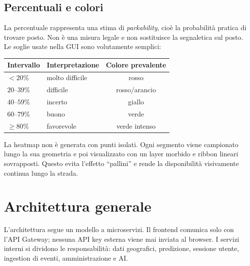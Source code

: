 \documentclass[11pt,a4paper]{article}
\begin{document}
\subsection{Percentuali e colori}

La percentuale rappresenta una stima di \emph{parkability}, cio\`e la probabilit\`a pratica di trovare posto. Non \`e una misura legale e non sostituisce la segnaletica sul posto. Le soglie usate nella GUI sono volutamente semplici:

\begin{center}
\begin{tabular}{@{}llc@{}}
\toprule
Intervallo & Interpretazione & Colore prevalente \\
\midrule
$<20\%$ & molto difficile & rosso \\
$20$--$39\%$ & difficile & rosso/arancio \\
$40$--$59\%$ & incerto & giallo \\
$60$--$79\%$ & buono & verde \\
$\geq80\%$ & favorevole & verde intenso \\
\bottomrule
\end{tabular}
\end{center}

La heatmap non \`e generata con punti isolati. Ogni segmento viene campionato lungo la sua geometria e poi visualizzato con un layer morbido e ribbon lineari sovrapposti. Questo evita l'effetto ``pallini'' e rende la disponibilit\`a visivamente continua lungo la strada.

\section{Architettura generale}

L'architettura segue un modello a microservizi. Il frontend comunica solo con l'API Gateway; nessuna API key esterna viene mai inviata al browser. I servizi interni si dividono le responsabilit\`a: dati geografici, predizione, sessione utente, ingestion di eventi, amministrazione e AI.
\end{document}

